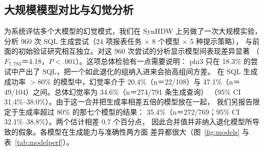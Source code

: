 \documentclass[11pt,a4paper]{article}
\begin{document}
\subsection{大规模模型对比与幻觉分析}
为系统评估多个大模型的幻觉模式，我们在 SynHDW 上另做了一次大规模实验，
分析 960 次 SQL 生成尝试（24 项报表任务 $\times$ 8 个模型 $\times$ 5 种提示策略），
与前面的初始验证研究相互独立。对这 960 次尝试的分析显示模型间表现差异显著
（$F_{7,783}$＝4.18，$P<.001$）。这项总体检验有一点需要说明：
phi3 只在 18.3\% 的尝试中产出了 SQL，把一个如此退化的组纳入进来会抬高组间方差。
在 SQL 生成成功率 $>$80\% 的模型中，幻觉率介于 20.4\%（n＝22/108）与
47.1\%（n＝49/104）之间。总体幻觉率为 34.6\%（n＝274/791 条生成查询）
（95\% CI 31.4\%--38.0\%）。由于这一合并把生成率相差五倍的模型放在一起，
我们另报告限定于生成率超过 80\% 的那七个模型的结果：
35.4\%（n＝272/769；95\% CI 32.1\%--38.8\%）。两个估计相差 0.7 个百分点，
因此合并值并非纳入退化模型所导致的假象。各模型在生成能力与准确性两方面
差异都很大（图~\ref{fig:models} 与表~\ref{tab:modelperf}）。
\end{document}
